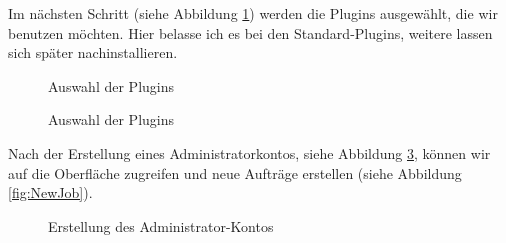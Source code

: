 Im nächsten Schritt (siehe Abbildung \ref{fig:Plugins}) werden die Plugins ausgewählt, die wir benutzen möchten. Hier belasse ich es bei den Standard-Plugins, weitere lassen sich später nachinstallieren.

\begin{figure}
\caption{Auswahl der Plugins}\label{fig:Plugins}
\end{figure}


\begin{figure}
\caption{Auswahl der Plugins}\label{fig:Plugins2}
\end{figure}

Nach der Erstellung eines Administratorkontos, siehe Abbildung \ref{fig:Admin}, können wir auf die Oberfläche zugreifen und neue Aufträge erstellen (siehe Abbildung \ref{fig:NewJob}).

\begin{figure}
\caption{Erstellung des Administrator-Kontos}\label{fig:Admin}
\end{figure}


